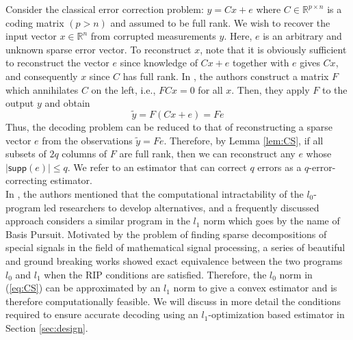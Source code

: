 \documentclass[../../thesis.tex]{subfiles}
\newcommand{\norm}[1]{\left\lVert#1\right\rVert}
\begin{document}
%
Consider the classical error correction problem: $y=Cx + e$ where $C\in \mathbb{R}^{p\times n}$ is a coding matrix $(p > n)$ and assumed to be full rank. We wish to recover the input vector $x \in \mathbb{R}^n$ from corrupted measurements $y$. Here, $e$ is an arbitrary and unknown sparse error vector. To reconstruct $x$, note that it is obviously sufficient to reconstruct the vector $e$ since knowledge of $Cx + e$ together with $e$ gives $Cx$, and consequently $x$ since $C$ has full rank. In \cite{tao11}, the authors construct a matrix $F$ which annihilates $C$ on the left, i.e.,  $FCx = 0$ for all $x$. Then, they apply $F$ to the output $y$ and obtain
\begin{equation}
	\tilde y = F (Cx + e) = Fe 
\end{equation}
Thus, the decoding problem can be reduced to that of reconstructing a sparse vector $e$ from the observations $\tilde y = Fe$. Therefore, by Lemma \ref{lem:CS}, if all subsets of $2q$ columns of $F$ are full rank, then we can reconstruct any $e$ whose  $\lvert \textsf{supp}(e) \rvert \le q$. We refer to an estimator that can correct $q$ errors as a $q$-error-correcting estimator.\\
In \cite{tao11}, the authors mentioned that the computational intractability of the $l_0$-program led researchers to develop alternatives, and a frequently discussed approach considers a similar program in the $l_1$ norm which goes by the name of Basis Pursuit. Motivated by the problem of finding sparse decompositions of special signals in the field of mathematical signal processing, a series of beautiful and ground breaking works \cite{Donoho2003, Elad2002, Gribonval11, Tropp2004} showed exact equivalence between the two programs $l_0$ and $l_1$ when the RIP conditions are satisfied. Therefore, the $l_0$ norm in (\ref{eq:CS}) can be approximated by an $l_1$ norm to give a convex estimator and is therefore computationally feasible. 
We will discuss in more detail the conditions required to ensure accurate decoding using an $l_1$-optimization based estimator in Section \ref{sec:design}. 
\end{document}
